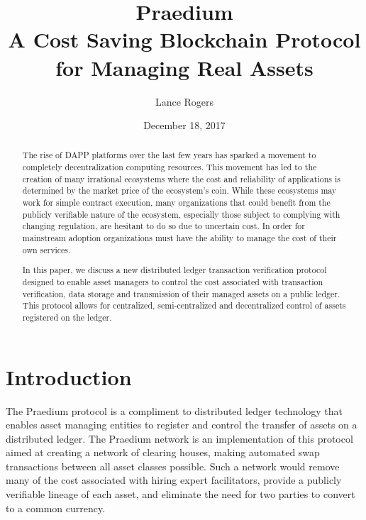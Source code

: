 \documentclass[12pt]{article}
\title{Praedium \\A Cost Saving Blockchain Protocol\\ for Managing Real Assets}
\author{Lance Rogers}
\date{December 18, 2017}
\begin{document}
\maketitle

\begin{abstract}
	

	
	
The rise of DAPP platforms over the last few years has sparked a movement to 
completely decentralization computing resources.  This movement has led to 
the creation of many irrational ecosystems where the cost and reliability of
applications is determined by the market price of the ecosystem's coin. %
While these ecosystems may work for simple contract execution,
many organizations that could benefit from the publicly verifiable nature of the
ecosystem, especially those subject to complying with changing regulation,
	are hesitant to do so due to uncertain cost. 
In order for mainstream adoption organizations must have the ability to manage
the cost of their own services.

In this paper, we discuss a new distributed ledger transaction verification
protocol designed to enable asset managers to control the cost associated with
transaction verification, data storage and transmission of their managed assets on 
	a public ledger.
This protocol allows for centralized, semi-centralized 
and decentralized control of assets registered on the ledger. 


\end{abstract}

\pagebreak

\tableofcontents

\pagebreak

\section{Introduction}



The Praedium protocol is a compliment to distributed ledger technology that enables
asset managing entities to register and control the transfer of assets on a distributed
ledger.  The Praedium network is an implementation of this protocol aimed at creating a network
of clearing houses, making automated swap transactions between all asset classes possible.  Such a network
would remove many of the cost associated with hiring expert facilitators, provide a publicly verifiable
lineage of each asset, and eliminate the need for two parties to convert to a common currency.
\end{document}
